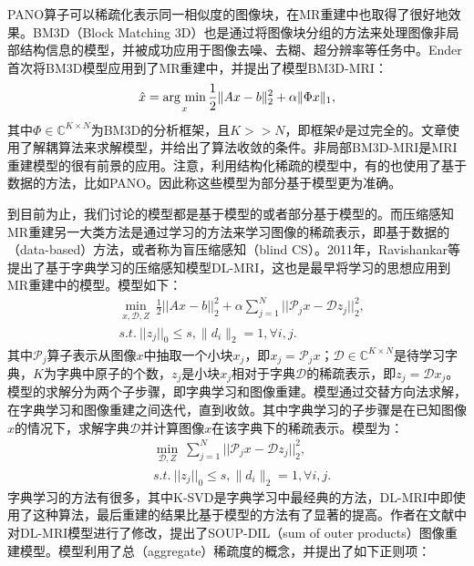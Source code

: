 PANO算子可以稀疏化表示同一相似度的图像块，在MR重建中也取得了很好地效果。BM3D（Block Matching 3D）\cite{dabov2007image}也是通过将图像块分组的方法来处理图像非局部结构信息的模型，并被成功应用于图像去噪、去糊、超分辨率等任务中。Ender\cite{eksioglu2016decoupled}首次将BM3D模型应用到了MR重建中，并提出了模型BM3D-MRI：
\begin{equation}
	\hat{x}=\argmin_x \frac{1}{2}\|Ax-b\|^2_2+\alpha\|\Phi x\|_1,
\end{equation}
其中$\Phi\in\mathbb{C}^{K\times N}$为BM3D的分析框架，且$K>>N$，即框架$\Phi$是过完全的。文章使用了解耦算法来求解模型，并给出了算法收敛的条件。非局部BM3D-MRI是MRI重建模型的很有前景的应用。注意，利用结构化稀疏的模型中，有的也使用了基于数据的方法，比如PANO。因此称这些模型为部分基于模型更为准确。

到目前为止，我们讨论的模型都是基于模型的或者部分基于模型的。而压缩感知MR重建另一大类方法是通过学习的方法来学习图像的稀疏表示，即基于数据的（data-based）方法，或者称为盲压缩感知\cite{gleichman2011blind}（blind CS）。2011年，Ravishankar等提出了基于字典学习的压缩感知模型DL-MRI\cite{dlmri}，这也是最早将学习的思想应用到MR重建中的模型。模型如下：
\begin{equation}
\begin{aligned}
	& \min_{x,\mathcal{D},Z}\ \frac{1}{2}||Ax-b||_2^2+\alpha\sum_{j=1}^N||\mathcal{P}_{j}x-\mathcal{D}z_j||_2^2,\\
	&s.t.\ ||z_j||_0\leq s, \|d_i\|_2=1, \forall i,j.
\end{aligned}
\end{equation}
其中$\mathcal{P}_j$算子表示从图像$x$中抽取一个小块$x_j$，即$x_j=\mathcal{P}_jx$；$\mathcal{D}\in \mathbb{C}^{K\times N}$是待学习字典，$K$为字典中原子的个数，$z_j$是小块$x_j$相对于字典$\mathcal{D}$的稀疏表示，即$z_j=\mathcal{D}x_j$。模型的求解分为两个子步骤，即字典学习和图像重建。模型通过交替方向法求解，在字典学习和图像重建之间迭代，直到收敛。其中字典学习的子步骤是在已知图像$x$的情况下，求解字典$\mathcal{D}$并计算图像$x$在该字典下的稀疏表示。模型为：
\begin{equation}
\begin{aligned}
	& \min_{\mathcal{D},Z}\ \sum_{j=1}^N||\mathcal{P}_{j}x-\mathcal{D}z_j||_2^2,\\
	&s.t.\ ||z_j||_0\leq s, \|d_i\|_2=1, \forall i,j.
\end{aligned}
\label{equ:dictlearning}
\end{equation}
字典学习的方法有很多\cite{ksvd,mairal2010online,rubinstein2009double}，其中K-SVD\cite{ksvd}是字典学习中最经典的方法，DL-MRI中即使用了这种算法，最后重建的结果比基于模型的方法有了显著的提高。作者在文献\cite{ravishankar2017efficient}中对DL-MRI模型进行了修改，提出了SOUP-DIL（sum of outer products）图像重建模型。模型利用了总（aggregate）稀疏度的概念，并提出了如下正则项：
